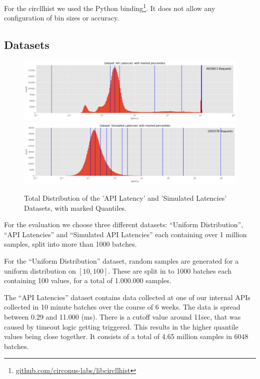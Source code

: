 \documentclass{article}
\theoremstyle{plain}
\theoremstyle{remark}
\begin{document}
For the circllhist we used the Python binding\footnote{\url{github.com/circonus-labs/libcircllhist}}.
It does not allow any configuration of bin sizes or accuracy.

\subsection{Datasets}

\begin{figure}
   \includegraphics[width=\textwidth/2]{evaluation/images/API_Latencies_distribution_percentiles.png}
   \includegraphics[width=\textwidth/2]{evaluation/images/Simulated_Latencies_distribution_percentiles.png}
   \caption{Total Distribution of the 'API Latency' and 'Simulated Latencies' Datasets, with marked Quantiles.}
   \label{fig:ds}
\end{figure}

For the evaluation we choose three different datasets: ``Uniform Distribution'', ``API Latencies'' and ``Simulated API Latencies''
each containing over 1 million samples, split into more than 1000 batches.


For the ``Uniform Distribution'' dataset, random samples are generated for a uniform distribution on $[10,100]$.
These are split in to 1000 batches each containing 100 values, for a total of 1.000.000 samples.

The ``API Latencies'' dataset contains data collected at one of our internal APIs collected in 10
minute batches over the course of 6 weeks.  The data is spread between 0.29 and 11.000 (ms).  There
is a cutoff value around 11sec, that was caused by timeout logic getting triggered.  This results in
the higher quantile values being close together.  It consists of a total of 4.65 million samples in
6048 batches.
\end{document}

